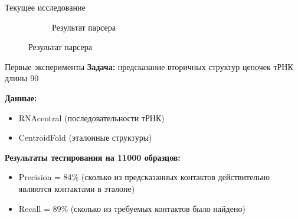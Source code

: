\documentclass{beamer}
\begin{document}
\begin{frame}{Текущее исследование}
\begin{figure}
\begin{subfigure}{.3\textwidth}
\end{subfigure}
\begin{subfigure}{.3\textwidth}
  \centering
  \caption{Результат парсера}
\end{subfigure}%
\end{figure}

\end{frame}

\begin{frame}{Первые эксперименты}
\textbf{Задача:} предсказание вторичных структур цепочек тРНК длины 90

\vspace{6mm}
\textbf{Данные:}
\begin{itemize}
    \item RNAcentral (последовательности тРНК)
    \item CentroidFold (эталонные структуры)
\end{itemize}

\vspace{6mm}

\textbf{Результаты тестирования на 11000 образцов:}
\begin{itemize}
    \item Precision = 84\% (сколько из предсказанных контактов действительно являются контактами в эталоне)
    \item Recall = 89\% (сколько из требуемых контактов было найдено)
\end{itemize}

\end{frame}
\end{document}
